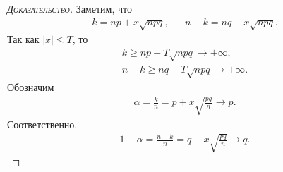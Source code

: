 \documentclass[../main.tex]{subfiles}
\begin{document}
\begin{proof}[\normalfont\textsc{Доказательство}]
 Заметим, что
 \begin{align*}
  k = np + x \sqrt{npq}, && n - k = nq - x \sqrt{npq}.
 \end{align*} Так как $ \left| x \right| \leqslant T $, то
 \begin{align*}
  k \geqslant np - T \sqrt{npq} \to +\infty, \\
  n - k \geqslant nq - T \sqrt{npq} \to +\infty
 .\end{align*} Обозначим
 \begin{align}
  \label{eq:proof:local_thm_muav_lap:alpha}
  \alpha = \frac{k}{n} = p + x\sqrt{\frac{pq}{n}} \to p
 .\end{align} Соответственно,
 \begin{align}
  \label{eq:proof:local_thm_muav_lap:alpha_compl}
  1 - \alpha = \frac{n - k}{n} = q - x \sqrt{\frac{pq}{n}} \to q.
 \end{align} 


\end{proof}
\end{document}
